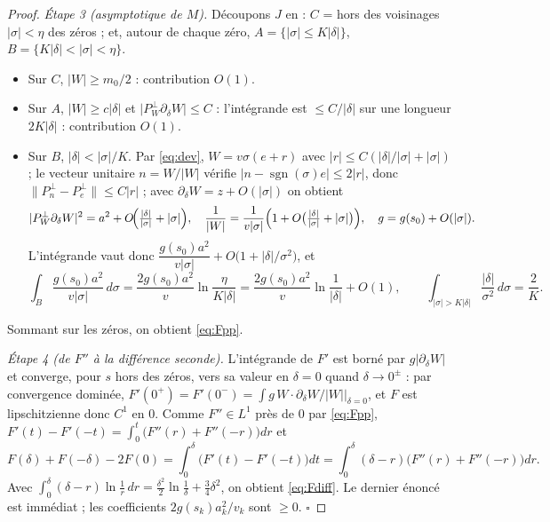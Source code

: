 \documentclass[11pt,a4paper]{article}
\theoremstyle{remark}
\newcommand{\dl}{\delta}
\begin{document}
\begin{proof}
\textit{Étape 3 (asymptotique de $M$).} Découpons $J$ en : $C$ = hors des voisinages $\lvert\sigma\rvert<\eta$ des zéros ; et, autour de chaque zéro, $A=\{\lvert\sigma\rvert\le K\lvert\dl\rvert\}$, $B=\{K\lvert\dl\rvert<\lvert\sigma\rvert<\eta\}$.
\begin{itemize}[nosep]
\item Sur $C$, $\lvert W\rvert\ge m_0/2$ : contribution $O(1)$.
\item Sur $A$, $\lvert W\rvert\ge c\lvert\dl\rvert$ et $\lvert P_W^\perp\partial_\dl W\rvert\le C$ : l'intégrande est $\le C/\lvert\dl\rvert$ sur une longueur $2K\lvert\dl\rvert$ : contribution $O(1)$.
\item Sur $B$, $\lvert\dl\rvert<\lvert\sigma\rvert/K$. Par \eqref{eq:dev}, $W=v\sigma(e+r)$ avec $\lvert r\rvert\le C(\lvert\dl\rvert/\lvert\sigma\rvert+\lvert\sigma\rvert)$ ; le vecteur unitaire $n=W/\lvert W\rvert$ vérifie $\lvert n-\operatorname{sgn}(\sigma)e\rvert\le2\lvert r\rvert$, donc $\lVert P_n^\perp-P_e^\perp\rVert\le C\lvert r\rvert$ ; avec $\partial_\dl W=z+O(\lvert\sigma\rvert)$ on obtient
\[
\lvert P_W^\perp\partial_\dl W\rvert^2=a^2+O\!\Bigl(\tfrac{\lvert\dl\rvert}{\lvert\sigma\rvert}+\lvert\sigma\rvert\Bigr),\quad
\frac1{\lvert W\rvert}=\frac1{v\lvert\sigma\rvert}\Bigl(1+O\bigl(\tfrac{\lvert\dl\rvert}{\lvert\sigma\rvert}+\lvert\sigma\rvert\bigr)\Bigr),\quad g=g(s_0)+O(\lvert\sigma\rvert).
\]
L'intégrande vaut donc $\dfrac{g(s_0)a^2}{v\lvert\sigma\rvert}+O\bigl(1+\lvert\dl\rvert/\sigma^2\bigr)$, et
\[
\int_B\frac{g(s_0)a^2}{v\lvert\sigma\rvert}\,d\sigma=\frac{2g(s_0)a^2}{v}\ln\frac{\eta}{K\lvert\dl\rvert}=\frac{2g(s_0)a^2}{v}\ln\frac1{\lvert\dl\rvert}+O(1),\qquad
\int_{\lvert\sigma\rvert>K\lvert\dl\rvert}\frac{\lvert\dl\rvert}{\sigma^2}\,d\sigma=\frac2K .
\]
\end{itemize}
Sommant sur les zéros, on obtient \eqref{eq:Fpp}.

\textit{Étape 4 (de $F''$ à la différence seconde).} L'intégrande de $F'$ est borné par $g\lvert\partial_\dl W\rvert$ et converge, pour $s$ hors des zéros, vers sa valeur en $\dl=0$ quand $\dl\to0^\pm$ : par convergence dominée, $F'(0^+)=F'(0^-)=\int g\,W\cdot\partial_\dl W/\lvert W\rvert|_{\dl=0}$, et $F$ est lipschitzienne donc $C^1$ en $0$. Comme $F''\in L^1$ près de $0$ par \eqref{eq:Fpp}, $F'(t)-F'(-t)=\int_0^t\bigl(F''(r)+F''(-r)\bigr)dr$ et
\[
F(\dl)+F(-\dl)-2F(0)=\int_0^\dl\bigl(F'(t)-F'(-t)\bigr)dt=\int_0^\dl(\dl-r)\bigl(F''(r)+F''(-r)\bigr)dr .
\]
Avec $\int_0^\dl(\dl-r)\ln\frac1r\,dr=\frac{\dl^2}2\ln\frac1\dl+\frac34\dl^2$, on obtient \eqref{eq:Fdiff}. Le dernier énoncé est immédiat ; les coefficients $2g(s_k)a_k^2/v_k$ sont $\ge0$. $\square$
\end{proof}
\end{document}
